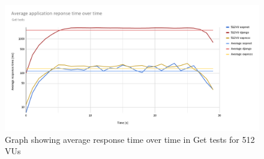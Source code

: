 \begin{figure}[H]
    \includegraphics[width=\columnwidth]{figures/pictures/influxGraph512VU.png}
    \caption{Graph showing average response time over time in Get tests for 512 VUs}
    \label{fig:influxGraph512}
\end{figure}
